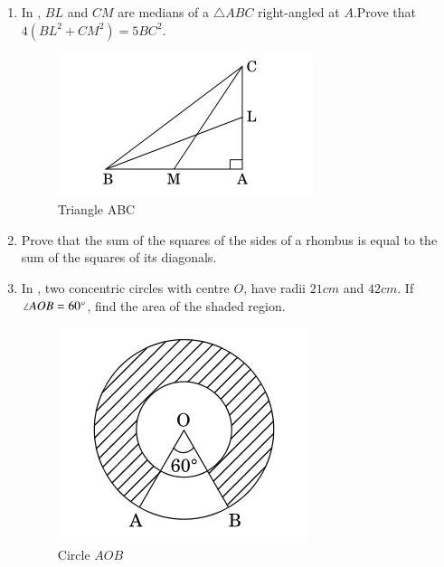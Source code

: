 \documentclass[12pt,-letter paper]{article}
\begin{document}
\begin{enumerate}
\item In , $BL$ and $CM$ are medians of a $\triangle ABC$ right-angled at $A$.Prove that $4(BL^2 + CM^2)= 5 BC^2$. 
\begin{figure}[H]
    \centering
    \includegraphics[width=\columnwidth]{figs/img1.jpg}
    \caption{Triangle ABC}
    \label{fig:Fig_1}
\end{figure}

\item Prove that the sum of the squares of the sides of a rhombus is equal to the sum of the squares of its diagonals. 
\item In , two concentric circles with centre $O$, have radii $21 cm$ and $42 cm$. If $\angle AOB = 60\degree$, find the area of the shaded region.
\begin{figure}[H]
    \centering
    \includegraphics[width=\columnwidth]{figs/img2.jpg}
    \caption{Circle $AOB$ }
    \label{fig:Fig_2}
\end{figure}


\end{enumerate}
\end{document}
